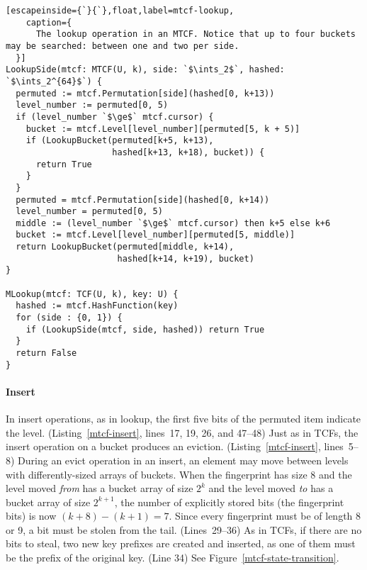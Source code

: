 \documentclass[letterpaper,twocolumn,10pt]{article}
\newcommand{\ints}{\mathbb{Z}}
\begin{document}
\begin{lstlisting}[escapeinside={`}{`},float,label=mtcf-lookup,
    caption={
      The lookup operation in an MTCF. Notice that up to four buckets may be searched: between one and two per side.
  }]
LookupSide(mtcf: MTCF(U, k), side: `$\ints_2$`, hashed: `$\ints_2^{64}$`) {
  permuted := mtcf.Permutation[side](hashed[0, k+13))
  level_number := permuted[0, 5)
  if (level_number `$\ge$` mtcf.cursor) {
    bucket := mtcf.Level[level_number][permuted[5, k + 5)]
    if (LookupBucket(permuted[k+5, k+13),
                     hashed[k+13, k+18), bucket)) {
      return True
    }
  }
  permuted = mtcf.Permutation[side](hashed[0, k+14))
  level_number = permuted[0, 5)
  middle := (level_number `$\ge$` mtcf.cursor) then k+5 else k+6
  bucket := mtcf.Level[level_number][permuted[5, middle)]
  return LookupBucket(permuted[middle, k+14),
                      hashed[k+14, k+19), bucket)
}

MLookup(mtcf: TCF(U, k), key: U) {
  hashed := mtcf.HashFunction(key)
  for (side : {0, 1}) {
    if (LookupSide(mtcf, side, hashed)) return True
  }
  return False
}
\end{lstlisting}


\paragraph{Insert}
In insert operations, as in lookup, the first five bits of the permuted item indicate the level. (Listing~\ref{mtcf-insert}, lines~17, 19, 26, and 47--48)
Just as in TCFs, the insert operation on a bucket produces an eviction. (Listing~\ref{mtcf-insert}, lines~5--8)
During an evict operation in an insert, an element may move between levels with differently-sized arrays of buckets.
When the fingerprint has size 8 and the level moved {\em from} has a bucket array of size $2^k$ and the level moved {\em to} has a bucket array of size $2^{k+1}$, the number of explicitly stored bits (the fingerprint bits) is now $(k + 8) - (k+1) = 7$.
Since every fingerprint must be of length 8 or 9, a bit must be stolen from the tail. (Lines~29--36)
As in TCFs, if there are no bits to steal, two new key prefixes are created and inserted, as one of them must be the prefix of the original key. (Line 34)
See Figure~\ref{mtcf-state-transition}.
\end{document}
